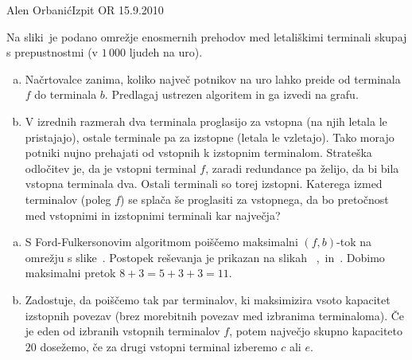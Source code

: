 \begin{naloga}{Alen Orbanić}{Izpit OR 15.9.2010}
\begin{vprasanje}
Na sliki~\fig je podano omrežje enosmernih prehodov
med letališkimi terminali skupaj s prepustnostmi (v $1\,000$ ljudeh na uro).

\begin{enumerate}[(a)]
\item Načrtovalce zanima,
koliko največ potnikov na uro lahko preide od terminala $f$ do terminala $b$.
Predlagaj ustrezen algoritem in ga izvedi na grafu.

\item V izrednih razmerah dva terminala proglasijo za vstopna
(na njih letala le pristajajo),
ostale terminale pa za izstopne (letala le vzletajo).
Tako morajo potniki nujno prehajati od vstopnih k izstopnim terminalom.
Strateška odločitev je, da je vstopni terminal $f$,
zaradi redundance pa želijo, da bi bila vstopna terminala dva.
Ostali terminali so torej izstopni.
Katerega izmed terminalov (poleg $f$) se splača še proglasiti za vstopnega,
da bo pretočnost med vstopnimi in izstopnimi terminali kar največja?
\end{enumerate}

\begin{slika}
\pgfslika
{}
\end{slika}
\end{vprasanje}

\begin{odgovor}
\begin{enumerate}[(a)]
\item S Ford-Fulkersonovim algoritmom poiščemo maksimalni $(f, b)$-tok
na omrež\-ju s slike~\fig.
Postopek reševanja je prikazan na slikah~%
,~ in~.
Dobimo maksimalni pretok $8+3 = 5+3+3 = 11$.

\item Zadostuje, da poiščemo tak par terminalov,
ki maksimizira vsoto kapacitet izstopnih povezav
(brez morebitnih povezav med izbranima terminaloma).
Če je eden od izbranih vstopnih terminalov $f$,
potem največjo skupno kapaciteto $20$ dosežemo,
če za drugi vstopni terminal izberemo $c$ ali $e$.
\end{enumerate}

\begin{slika}[p]
\end{slika}
\begin{slika}[p]
\end{slika}
\begin{slika}[p]
\end{slika}
\end{odgovor}
\end{naloga}
